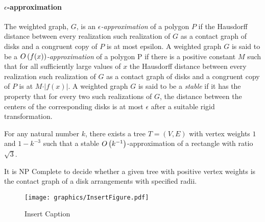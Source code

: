 \paragraph{$\epsilon$-approximation}
The weighted graph, $G$, is an \textit{$\epsilon$-approximation} of a polygon $P$ if the Hausdorff distance between every realization such realization of $G$ as a contact graph of disks and a congruent copy of $P$ is at most epsilon.  A weighted graph $G$ is said to be a \textit{$O\left( f(x) \right)$-approximation} of a polygon P if there is a positive constant $M$ such that for all sufficiently large values of $x$ the Hausdorff distance between every realization such realization of $G$ as a contact graph of disks and a congruent copy of $P$ is at $M \cdot \vert f(x)\vert$. A weighted graph $G$ is said to be a \textit{stable} if it has the property that for every two such realizations of $G$, the distance between the centers of the corresponding disks is at most $\epsilon$ after a suitable rigid transformation.  





\begin{lem}\label{lem:ContactGraphV3-1}
For any natural number $k$,  there exists a tree $T = (V,E)$ with vertex weights $1$ and $1 - k^{-3}$ such that a stable $O\left( k^{-1} \right)$-approximation of a rectangle with ratio $\sqrt{3}$.
\end{lem}
\begin{thm}\label{thm:ContactGraphV3-3}
It is NP Complete to decide whether a given tree with positive vertex weights is the contact graph of a disk arrangements with specified radii.
\end{thm}

\begin{figure}[!htbp]
\begin{center}
\texttt{[image: graphics/InsertFigure.pdf]}
\caption{Insert Caption}\label{fig:insertSomething}
\end{center}
\end{figure}

